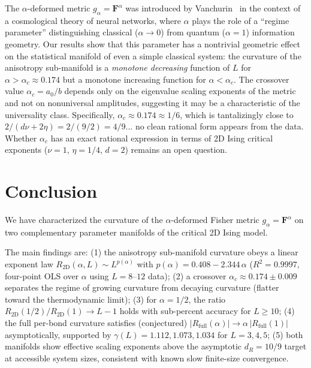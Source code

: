 \documentclass[twocolumn,showpacs,preprintnumbers,amsmath,amssymb,prl]{revtex4-2}
\newcommand{\Fmat}{\mathbf{F}}
\newcommand{\dR}{d_R}
\newcommand{\RtwoD}{R_{\mathrm{2D}}}
\newcommand{\Rfull}{R_{\mathrm{full}}}
\newcommand{\alphac}{\alpha_c}
\begin{document}
The $\alpha$-deformed metric $g_\alpha = \Fmat^\alpha$ was introduced by
Vanchurin~\cite{Vanchurin2021} in the context of a cosmological theory of neural
networks, where $\alpha$ plays the role of a ``regime parameter'' distinguishing
classical ($\alpha \to 0$) from quantum ($\alpha = 1$) information geometry.
Our results show that this parameter has a nontrivial geometric effect on the
statistical manifold of even a simple classical system:
the curvature of the anisotropy sub-manifold is a \emph{monotone decreasing}
function of $L$ for $\alpha > \alphac \approx 0.174$ but a monotone increasing
function for $\alpha < \alphac$.
The crossover value $\alphac = a_0/b$ depends only on the eigenvalue scaling
exponents of the metric and not on nonuniversal amplitudes, suggesting it may
be a characteristic of the universality class.
Specifically, $\alphac \approx 0.174 \approx 1/6$, which is tantalizingly close
to $2/(d\nu + 2\eta) = 2/(9/2) = 4/9$... no clean rational form appears from
the data.
Whether $\alphac$ has an exact rational expression in terms of 2D Ising critical
exponents ($\nu = 1$, $\eta = 1/4$, $d = 2$) remains an open question.

\section{Conclusion}
\label{sec:conclusion}

We have characterized the curvature of the $\alpha$-deformed Fisher metric
$g_\alpha = \Fmat^\alpha$ on two complementary parameter manifolds of the
critical 2D Ising model.

The main findings are:
(1) the anisotropy sub-manifold curvature obeys a linear exponent law
$\RtwoD(\alpha, L) \sim L^{p(\alpha)}$ with $p(\alpha) = 0.408 - 2.344\,\alpha$
($R^2 = 0.9997$, four-point OLS over $\alpha$ using $L = 8$--$12$ data);
(2) a crossover $\alphac \approx 0.174 \pm 0.009$ separates the regime of growing
curvature from decaying curvature (flatter toward the thermodynamic limit);
(3) for $\alpha = 1/2$, the ratio $\RtwoD(1/2)/\RtwoD(1) \to L - 1$ holds
with sub-percent accuracy for $L \geq 10$;
(4) the full per-bond curvature satisfies (conjectured)
$|\Rfull(\alpha)| \to \alpha\,|\Rfull(1)|$ asymptotically, supported by
$\gamma(L) = 1.112, 1.073, 1.034$ for $L = 3, 4, 5$;
(5) both manifolds show effective scaling exponents above the asymptotic
$\dR = 10/9$ target at accessible system sizes, consistent with known slow
finite-size convergence.
\end{document}

